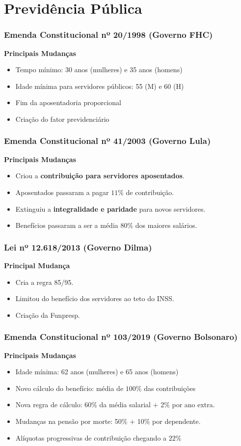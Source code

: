 \section{Previdência Pública}

\begin{frame}[c]\frametitle{Emenda Constitucional nº 20/1998 (Governo FHC)}
  \textbf{Principais Mudanças}
  \begin{itemize}
    \item Tempo mínimo: 30 anos (mulheres) e 35 anos (homens)
    \item Idade mínima para servidores públicos: 55 (M) e 60 (H)
    \item Fim da aposentadoria proporcional
    \item Criação do fator previdenciário
  \end{itemize}
\end{frame}

\begin{frame}[c]\frametitle{Emenda Constitucional nº 41/2003 (Governo Lula)}
  \textbf{Principais Mudanças}
  \begin{itemize}
    \item Criou a \textbf{contribuição para servidores aposentados}.
    \item Aposentados passaram  a pagar $11\%$ de contribuição.
    \item Extinguiu a \textbf{integralidade e paridade} para novos servidores.
    \item Benefícios passaram a ser a média $80\%$ dos maiores salários.
  \end{itemize}
\end{frame}

\begin{frame}[c]\frametitle{Lei nº 12.618/2013 (Governo Dilma)}
  \textbf{Principal Mudança}
  \begin{itemize}
    \item Cria a regra 85/95.
    \item Limitou do benefício dos servidores ao teto do INSS.
    \item Criação da Funpresp.
  \end{itemize}
\end{frame}

\begin{frame}[c]\frametitle{Emenda Constitucional nº 103/2019 (Governo Bolsonaro)}
  \textbf{Principais Mudanças}
  \begin{itemize}
    \item Idade mínima: 62 anos (mulheres) e 65 anos (homens)
    \item Novo cálculo do benefício: média de $100\%$ das contribuições
    \item Nova regra de cálculo: 60\% da média salarial + 2\% por ano extra.
    \item Mudanças na pensão por morte: 50\% + 10\% por dependente.
    \item Alíquotas progressivas de contribuição chegando a $22\%$
  \end{itemize}
\end{frame}